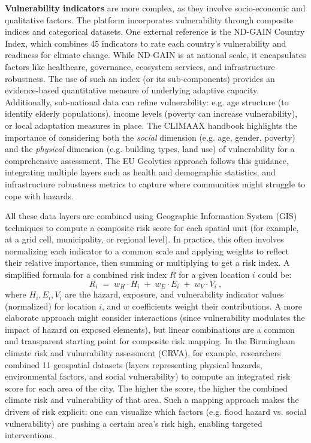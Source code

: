 \documentclass[10pt, conference]{IEEEtran}
\begin{document}
\textbf{Vulnerability indicators} are more complex, as they involve socio-economic and qualitative factors. The platform incorporates vulnerability through composite indices and categorical datasets. One external reference is the ND-GAIN Country Index, which combines 45 indicators to rate each country’s vulnerability and readiness for climate change. While ND-GAIN is at national scale, it encapsulates factors like healthcare, governance, ecosystem services, and infrastructure robustness. The use of such an index (or its sub-components) provides an evidence-based quantitative measure of underlying adaptive capacity. Additionally, sub-national data can refine vulnerability: e.g. age structure (to identify elderly populations), income levels (poverty can increase vulnerability), or local adaptation measures in place. The CLIMAAX handbook highlights the importance of considering both the \textit{social} dimension (e.g. age, gender, poverty) and the \textit{physical} dimension (e.g. building types, land use) of vulnerability for a comprehensive assessment. The EU Geolytics approach follows this guidance, integrating multiple layers such as health and demographic statistics, and infrastructure robustness metrics to capture where communities might struggle to cope with hazards.

All these data layers are combined using Geographic Information System (GIS) techniques to compute a composite risk score for each spatial unit (for example, at a grid cell, municipality, or regional level). In practice, this often involves normalizing each indicator to a common scale and applying weights to reflect their relative importance, then summing or multiplying to get a risk index. A simplified formula for a combined risk index $R$ for a given location $i$ could be:
\begin{equation}
R_i \;=\; w_H \cdot H_i \;+\; w_E \cdot E_i \;+\; w_V \cdot V_i~,
\end{equation}
where $H_i, E_i, V_i$ are the hazard, exposure, and vulnerability indicator values (normalized) for location $i$, and $w$ coefficients weight their contributions. A more elaborate approach might consider interactions (since vulnerability modulates the impact of hazard on exposed elements), but linear combinations are a common and transparent starting point for composite risk mapping. In the Birmingham climate risk and vulnerability assessment (CRVA), for example, researchers combined 11 geospatial datasets (layers representing physical hazards, environmental factors, and social vulnerability) to compute an integrated risk score for each area of the city. The higher the score, the higher the combined climate risk and vulnerability of that area. Such a mapping approach makes the drivers of risk explicit: one can visualize which factors (e.g. flood hazard vs. social vulnerability) are pushing a certain area’s risk high, enabling targeted interventions.
\end{document}

